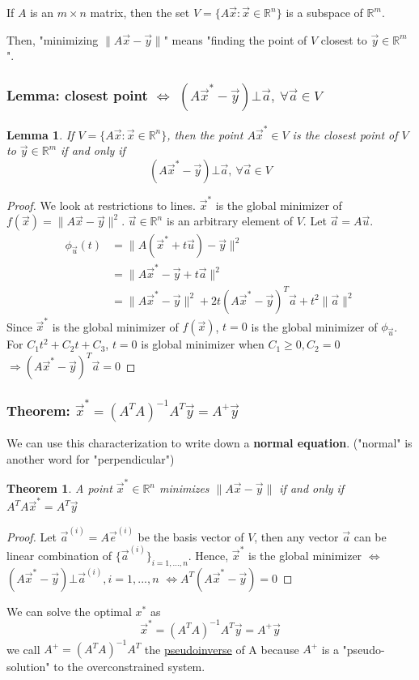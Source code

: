 \documentclass[11pt,a4paper]{article}
\newtheorem{theorem}{Theorem}
\newtheorem{lemma}{Lemma}
\begin{document}
If $A$ is an $m\times n$ matrix, then the set $V=\{A\vec{x}:\vec{x}\in \mathbb{R}^n\}$ is a subspace of $\mathbb{R}^m$.

Then, "minimizing $\|A\vec{x}-\vec{y}\|$" means "finding the point of $V$ closest to $\vec{y}\in \mathbb{R}^m$".

\subsubsection{Lemma: closest point $\Leftrightarrow$ $(A\vec{x}^*-\vec{y})\bot \vec{a},\ \forall\vec{a}\in V$}
\begin{lemma}
    If $V=\{A\vec{x}:\vec{x}\in \mathbb{R}^n\}$, then the point $A\vec{x}^*\in V$ is the closest point of $V$ to $\vec{y}\in \mathbb{R}^m$ if and only if $$(A\vec{x}^*-\vec{y})\bot \vec{a},\ \forall\vec{a}\in V$$
\end{lemma}
\begin{proof}
We look at restrictions to lines. $\vec{x}^*$ is the global minimizer of $f(\vec{x})=\|A\vec{x}-\vec{y}\|^2$. $\vec{u}\in \mathbb{R}^n$ is an arbitrary element of $V$. Let $\vec{a}=A\vec{u}$.
\begin{equation}
    \begin{aligned}
        \phi_{\vec{u}}(t)&=\|A(\vec{x}^*+t\vec{u})-\vec{y}\|^2\\
        &=\|A\vec{x}^*-\vec{y}+t\vec{a}\|^2\\
        &=\|A\vec{x}^*-\vec{y}\|^2+2t(A\vec{x}^*-\vec{y})^T\vec{a}+t^2\|\vec{a}\|^2
    \end{aligned}
    \nonumber
\end{equation}
Since $\vec{x}^*$ is the global minimizer of $f(\vec{x})$, $t=0$ is the global minimizer of $\phi_{\vec{u}}$. For $C_1t^2+C_2t+C_3$, $t=0$ is global minimizer when $C_1\geq 0, C_2=0$ $\Rightarrow (A\vec{x}^*-\vec{y})^T\vec{a}=0$
\end{proof}

\subsubsection{Theorem: $\vec{x}^*=(A^TA)^{-1}A^T\vec{y}=A^+ \vec{y}$}
We can use this characterization to write down a \textbf{normal equation}. ("normal" is another word for "perpendicular")
\begin{theorem}
    A point $\vec{x}^*\in \mathbb{R}^n$ minimizes $\|A\vec{x}-\vec{y}\|$ if and only if $A^TA\vec{x}^*=A^T\vec{y}$
\end{theorem}
\begin{proof}
    Let $\vec{a}^{(i)}=A\vec{e}^{(i)}$ be the basis vector of $V$, then any vector $\vec{a}$ can be linear combination of $\{\vec{a}^{(i)}\}_{i=1,...,n}$. Hence, $\vec{x}^*$ is the global minimizer $\Leftrightarrow$ $(A\vec{x}^*-\vec{y})\bot \vec{a}^{(i)},i=1,...,n$ $\Leftrightarrow A^T(A\vec{x}^*-\vec{y})=0$
\end{proof}
We can solve the optimal $x^*$ as $$\vec{x}^*=(A^TA)^{-1}A^T\vec{y}=A^+ \vec{y}$$
we call $A^+=(A^TA)^{-1}A^T$ the \underline{pseudoinverse} of A because $A^+$ is a "pseudo-solution" to the overconstrained system.
\end{document}
